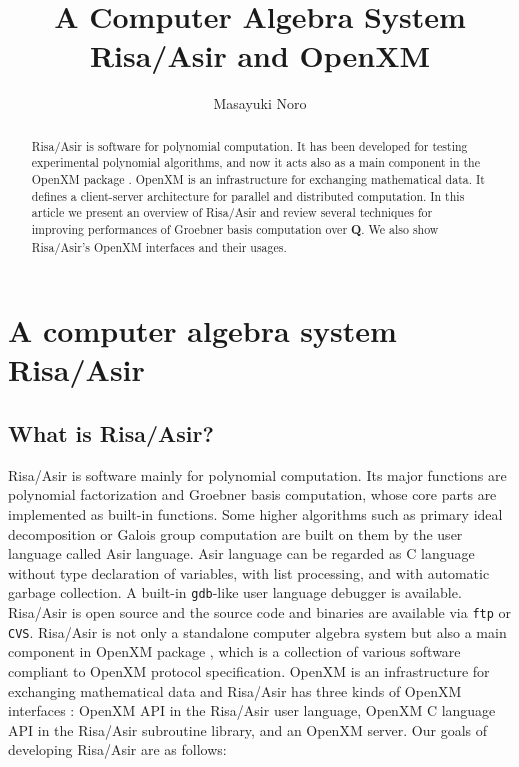 \documentclass[runningheads]{cl2emult}
\begin{document}
%
\title*{A Computer Algebra System Risa/Asir and OpenXM}
%
%
%
%
%
\author{Masayuki Noro}
%
%
%

\maketitle              %

\begin{abstract}
Risa/Asir is software for polynomial computation. It has been
developed for testing experimental polynomial algorithms, and now it
acts also as a main component in the OpenXM package \cite{OPENXM}.
OpenXM is an infrastructure for exchanging mathematical
data.  It defines a client-server architecture for parallel and
distributed computation. In this article we present an overview of
Risa/Asir and review several techniques for improving performances of
Groebner basis computation over {\bf Q}. We also show Risa/Asir's
OpenXM interfaces and their usages.
\end{abstract}

\section{A computer algebra system Risa/Asir}

\subsection{What is Risa/Asir?}

Risa/Asir \cite{RISA} is software mainly for polynomial
computation. Its major functions are polynomial factorization and
Groebner basis computation, whose core parts are implemented as
built-in functions.  Some higher algorithms such as primary ideal
decomposition or Galois group computation are built on them by the
user language called Asir language. Asir language can be regarded as C
language without type declaration of variables, with list processing,
and with automatic garbage collection. A built-in {\tt gdb}-like user
language debugger is available. Risa/Asir is open source and the
source code and binaries are available via {\tt ftp} or {\tt CVS}.
Risa/Asir is not only a standalone computer algebra system but also a
main component in OpenXM package \cite{OPENXM}, which is a collection
of various software compliant to OpenXM protocol specification.
OpenXM is an infrastructure for exchanging mathematical data and
Risa/Asir has three kinds of OpenXM interfaces : 
OpenXM API in the Risa/Asir user language, 
OpenXM C language API in the Risa/Asir subroutine library, 
and an OpenXM server. 
Our goals of developing Risa/Asir are as follows:
\end{document}

